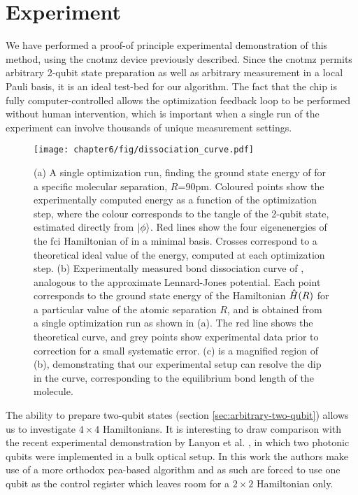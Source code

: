 \section{Experiment} 
\label{sec:chemistry-experiment}
We have performed a proof-of principle experimental demonstration of this method, using the \acrshort{cnotmz} device previously described. Since the \acrshort{cnotmz} permits arbitrary 2-qubit state preparation as well as arbitrary measurement in a local Pauli basis, it is an ideal test-bed for our algorithm. The fact that the chip is fully computer-controlled allows the optimization feedback loop to be performed without human intervention, which is important when a single run of the experiment can involve thousands of unique measurement settings.

\begin{figure}[t!]
\centering
\texttt{[image: chapter6/fig/dissociation\_curve.pdf]}
\caption[Bond dissociation curve of \hehplus, simulated using the \acrshort{cnotmz}]{ 
    (a) A single optimization run, finding the ground state energy of \hehplus for a specific molecular separation, $R$=90pm. Coloured points show the experimentally computed energy as a function of the optimization step, where the colour corresponds to the tangle of the 2-qubit state, estimated directly from $\mbox{$ | \phi \rangle $}$. Red lines show the four eigenenergies of the \gls{fci} Hamiltonian of \hehplus in a minimal basis. Crosses correspond to a theoretical ideal value of the energy, computed at each optimization step.
(b) Experimentally measured bond dissociation curve of \hehplus, analogous to the approximate Lennard-Jones potential. Each point corresponds to the ground state energy of the Hamiltonian $\hat{H}(R)$ for a particular value of the atomic separation $R$, and is obtained from a single optimization run as shown in (a). The red line shows the theoretical curve, and grey points show experimental data prior to correction for a small systematic error. (c) is a magnified region of (b), demonstrating that our experimental setup can resolve the dip in the curve, corresponding to the equilibrium bond length of the molecule.
}
\label{fig:chemistry-bond-dissociation}
\end{figure}

The ability to prepare two-qubit states (section \ref{sec:arbitrary-two-qubit}) allows us to investigate $4\times4$ Hamiltonians. It is interesting to draw comparison with the recent experimental demonstration by Lanyon et al. \cite{Lanyon2010}, in which two photonic qubits were implemented in a bulk optical setup. In this work the authors make use of a more orthodox \gls{pea}-based algorithm and as such are forced to use one qubit as the control register which leaves room for a $2\times2$ Hamiltonian only. 

